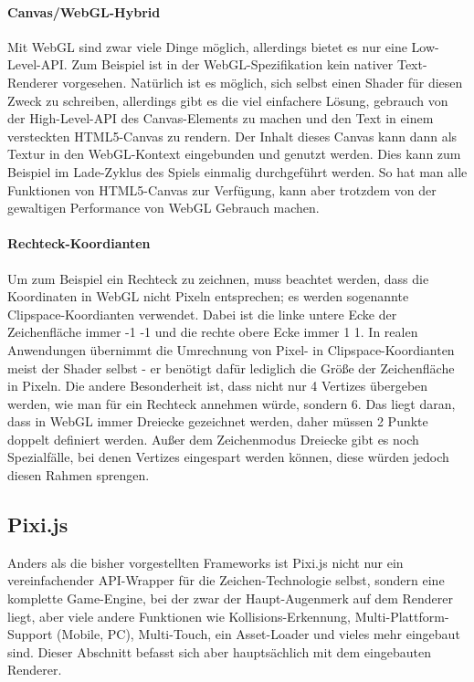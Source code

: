 \documentclass[a4paper, 12pt]{article}
\begin{document}
\paragraph{Canvas/WebGL-Hybrid} Mit WebGL sind zwar viele Dinge möglich, allerdings bietet es nur eine Low-Level-API. Zum Beispiel ist in der WebGL-Spezifikation kein nativer Text-Renderer vorgesehen. Natürlich ist es möglich, sich selbst einen Shader für diesen Zweck zu schreiben, allerdings gibt es die viel einfachere Lösung, gebrauch von der High-Level-API des Canvas-Elements zu machen und den Text in einem versteckten HTML5-Canvas zu rendern. Der Inhalt dieses Canvas kann dann als Textur in den WebGL-Kontext eingebunden und genutzt werden. Dies kann zum Beispiel im Lade-Zyklus des Spiels einmalig durchgeführt werden. So hat man alle Funktionen von HTML5-Canvas zur Verfügung, kann aber trotzdem von der gewaltigen Performance von WebGL Gebrauch machen.\cite{WebGLTextRender}
\paragraph{Rechteck-Koordianten} Um zum Beispiel ein Rechteck zu zeichnen, muss beachtet werden, dass die Koordinaten in WebGL nicht Pixeln entsprechen; es werden sogenannte Clipspace-Koordianten verwendet. Dabei ist die linke untere Ecke der Zeichenfläche immer -1 -1 und die rechte obere Ecke immer 1 1. In realen Anwendungen übernimmt die Umrechnung von Pixel- in Clipspace-Koordianten meist der Shader selbst - er benötigt dafür lediglich die Größe der Zeichenfläche in Pixeln. Die andere Besonderheit ist, dass nicht nur 4 Vertizes übergeben werden, wie man für ein Rechteck annehmen würde, sondern 6. Das liegt daran, dass in WebGL immer Dreiecke gezeichnet werden, daher müssen 2 Punkte doppelt definiert werden. Außer dem Zeichenmodus Dreiecke gibt es noch Spezialfälle, bei denen Vertizes eingespart werden können, diese würden jedoch diesen Rahmen sprengen.
\newpage
\subsection{Pixi.js} Anders als die bisher vorgestellten Frameworks ist Pixi.js nicht nur ein vereinfachender API-Wrapper für die Zeichen-Technologie selbst, sondern eine komplette Game-Engine, bei der zwar der Haupt-Augenmerk auf dem Renderer liegt, aber viele andere Funktionen wie Kollisions-Erkennung, Multi-Plattform-Support (Mobile, PC), Multi-Touch, ein Asset-Loader und vieles mehr eingebaut sind. Dieser Abschnitt befasst sich aber hauptsächlich mit dem eingebauten Renderer.\cite{PixiJS}
\end{document}
